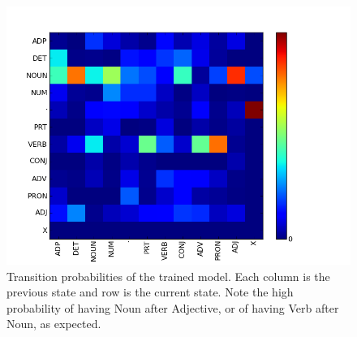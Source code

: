 \begin{figure}
\centering
\includegraphics[scale=.5]{figs/sequences/transition_probs}
\caption{\label{fig:transProbs} Transition probabilities of the
trained model. Each column is the previous state and row is the current
state. Note the high probability of having Noun after Adjective, or of having Verb after Noun, as expected.}
\end{figure}

